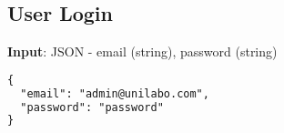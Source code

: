 \documentclass[a4paper]{report}
\begin{document}
            \subsection{User Login}
          \textbf{Input}: JSON - email (string), password (string)
          \begin{lstlisting}[language=TeX]
{
  "email": "admin@unilabo.com",
  "password": "password"
}
          \end{lstlisting}
\end{document}
